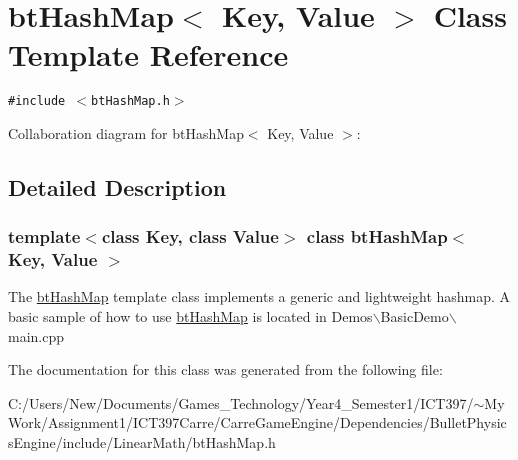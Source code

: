\hypertarget{classbt_hash_map}{
\section{btHashMap$<$ Key, Value $>$ Class Template Reference}
\label{classbt_hash_map}
}
{\tt \#include $<$btHashMap.h$>$}

Collaboration diagram for btHashMap$<$ Key, Value $>$:

\subsection{Detailed Description}
\subsubsection*{template$<$class Key, class Value$>$ class btHashMap$<$ Key, Value $>$}

The \hyperlink{classbt_hash_map}{btHashMap} template class implements a generic and lightweight hashmap. A basic sample of how to use \hyperlink{classbt_hash_map}{btHashMap} is located in Demos$\backslash$BasicDemo$\backslash$main.cpp 

The documentation for this class was generated from the following file:\begin{CompactItemize}
\item 
C:/Users/New/Documents/Games\_\-Technology/Year4\_\-Semester1/ICT397/$\sim$My Work/Assignment1/ICT397Carre/CarreGameEngine/Dependencies/BulletPhysicsEngine/include/LinearMath/btHashMap.h\end{CompactItemize}
